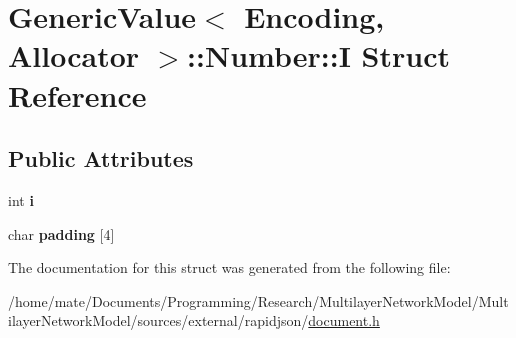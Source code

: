 \hypertarget{structGenericValue_1_1Number_1_1I}{}\section{Generic\+Value$<$ Encoding, Allocator $>$\+:\+:Number\+:\+:I Struct Reference}
\label{structGenericValue_1_1Number_1_1I}
\subsection*{Public Attributes}
\begin{DoxyCompactItemize}
\item 
int {\bfseries i}\hypertarget{structGenericValue_1_1Number_1_1I_ae0b250dc448d284cf9019f3932bfc380}{}\label{structGenericValue_1_1Number_1_1I_ae0b250dc448d284cf9019f3932bfc380}

\item 
char {\bfseries padding} \mbox{[}4\mbox{]}\hypertarget{structGenericValue_1_1Number_1_1I_aefc064997f30c9c0b2bdce187d1d4cce}{}\label{structGenericValue_1_1Number_1_1I_aefc064997f30c9c0b2bdce187d1d4cce}

\end{DoxyCompactItemize}


The documentation for this struct was generated from the following file\+:\begin{DoxyCompactItemize}
\item 
/home/mate/\+Documents/\+Programming/\+Research/\+Multilayer\+Network\+Model/\+Multilayer\+Network\+Model/sources/external/rapidjson/\hyperlink{document_8h}{document.\+h}\end{DoxyCompactItemize}
